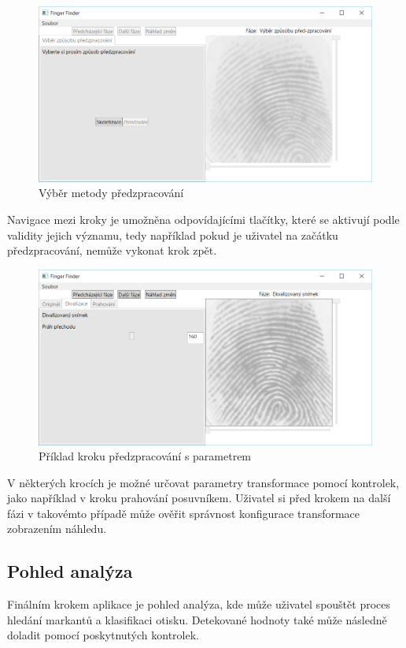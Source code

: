 \documentclass[12pt,a4paper]{article}
\begin{document}
\begin{figure}[h]
  \centering
\includegraphics[width=120mm]{img/um_02_preprocess.png}
  \caption{Výběr metody předzpracování}
\end{figure}
Navigace mezi kroky je umožněna odpovídajícími tlačítky, které se aktivují podle validity jejich významu, tedy například pokud je uživatel na začátku předzpracování, nemůže vykonat krok zpět.
\begin{figure}[h]
  \centering
\includegraphics[width=120mm]{img/um_03_steps.png}
  \caption{Příklad kroku předzpracování s parametrem}
\end{figure}
V některých krocích je možné určovat parametry transformace pomocí kontrolek, jako například v kroku prahování posuvníkem. Uživatel si před krokem na další fázi v takovémto případě může ověřit správnost konfigurace transformace zobrazením náhledu.

\subsection{Pohled analýza}
Finálním krokem aplikace je pohled analýza, kde může uživatel spouštět proces hledání markantů a klasifikaci otisku. Detekované hodnoty také může následně doladit pomocí poskytnutých kontrolek.
\end{document}
